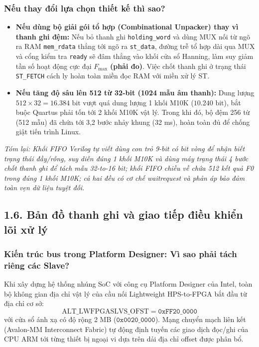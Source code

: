 \subsubsection*{Nếu thay đổi lựa chọn thiết kế thì sao?}
\begin{itemize}[leftmargin=1.5em, itemsep=3pt]
    \item \textbf{Nếu dùng bộ giải gói tổ hợp (Combinational Unpacker) thay vì thanh ghi đệm:} Nếu bỏ thanh ghi \texttt{holding\_word} và dùng MUX nối từ ngõ ra RAM \texttt{mem\_rdata} thẳng tới ngõ ra \texttt{st\_data}, đường trễ tổ hợp dài qua MUX và cổng kiểm tra \texttt{ready} sẽ đâm thẳng vào khối cửa sổ Hanning, làm suy giảm tần số hoạt động cực đại $F_{\max}$ \textbf{(phải đo)}. Việc chốt thanh ghi ở trạng thái \texttt{ST\_FETCH} cách ly hoàn toàn miền đọc RAM với miền xử lý ST.
    \item \textbf{Nếu tăng độ sâu lên 512 từ 32-bit (1024 mẫu âm thanh):} Dung lượng $512 \times 32 = 16.384\text{ bit}$ vượt quá dung lượng 1 khối M10K ($10.240\text{ bit}$), bắt buộc Quartus phải tốn tới 2 khối M10K vật lý. Trong khi đó, bộ đệm 256 từ (512 mẫu) đã chứa tới 3,2 bước nhảy khung (32 ms), hoàn toàn đủ để chống giật tiến trình Linux.
\end{itemize}

\textit{Tóm lại: Khối FIFO Verilog tự viết dùng con trỏ 9-bit có bit vòng để nhận biết trạng thái đầy/rỗng, suy diễn đúng 1 khối M10K và dùng máy trạng thái 4 bước chốt thanh ghi để tách mẫu 32-to-16 bit; khối FIFO chiều về chứa 512 kết quả F0 trong đúng 1 khối M10K; cả hai đều có cơ chế waitrequest và phản áp bảo đảm toàn vẹn dữ liệu tuyệt đối.}

\subsection*{1.6. Bản đồ thanh ghi và giao tiếp điều khiển lõi xử lý}

\subsubsection*{Kiến trúc bus trong Platform Designer: Vì sao phải tách riêng các Slave?}
Khi xây dựng hệ thống nhúng SoC với công cụ Platform Designer của Intel, toàn bộ không gian địa chỉ vật lý của cầu nối Lightweight HPS-to-FPGA bắt đầu từ địa chỉ cơ sở:
\begin{equation}
\text{ALT\_LWFPGASLVS\_OFST} = \mathtt{0xFF20\_0000}
\end{equation}
với cửa sổ ánh xạ có độ rộng 2 MB ($\mathtt{0x0020\_0000}$). Mạng chuyển mạch liên kết (Avalon-MM Interconnect Fabric) tự động định tuyến các giao dịch đọc/ghi của CPU ARM tới từng thiết bị ngoại vi dựa trên dải địa chỉ offset được phân bổ.

